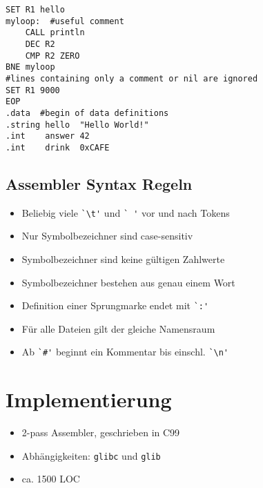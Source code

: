 \begin{frame}[fragile]{\insertsubsection}
\begin{verbatim}
SET R1 hello
myloop:  #useful comment
    CALL println
    DEC R2
    CMP R2 ZERO
BNE myloop
#lines containing only a comment or nil are ignored
SET R1 9000
EOP
.data  #begin of data definitions
.string hello  "Hello World!"
.int    answer 42
.int    drink  0xCAFE
\end{verbatim}
\end{frame}

\subsection{Assembler Syntax Regeln}

\begin{frame}[fragile]{\insertsubsection}
    \begin{itemize}
        \item Beliebig viele \verb#`\t'# und \verb*#` '# vor und nach Tokens
        \item Nur Symbolbezeichner sind case-sensitiv
        \item Symbolbezeichner sind keine gültigen Zahlwerte
        \item Symbolbezeichner bestehen aus genau einem Wort
    \end{itemize}
\end{frame}

\begin{frame}[fragile]{\insertsubsection}
    \begin{itemize}
        \item Definition einer Sprungmarke endet mit \verb#`:'#
        \item Für alle Dateien gilt der gleiche Namensraum
        \item Ab \verb|`#'| beginnt ein Kommentar bis einschl. \verb#`\n'#
    \end{itemize}
\end{frame}

\section{Implementierung}

\begin{frame}[fragile]{\insertsection}
    \begin{itemize}
        \item 2-pass Assembler, geschrieben in C99
        \item Abhängigkeiten: \texttt{glibc} und \texttt{glib}
        \item ca. 1500 LOC
    \end{itemize}
\end{frame}

